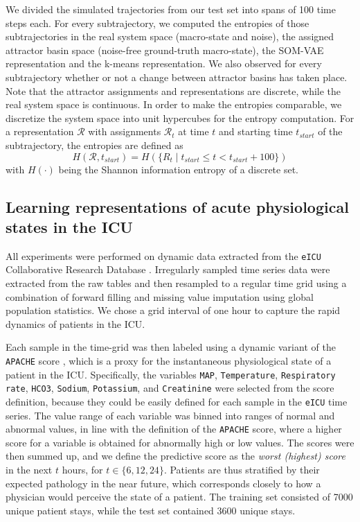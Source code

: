 We divided the simulated trajectories from our test set into spans of 100 time steps each.
For every subtrajectory, we computed the entropies of those subtrajectories in the real system space (macro-state and noise), the assigned attractor basin space (noise-free ground-truth macro-state), the SOM-VAE representation and the k-means representation.
We also observed for every subtrajectory whether or not a change between attractor basins has taken place.
Note that the attractor assignments and representations are discrete, while the real system space is continuous.
In order to make the entropies comparable, we discretize the system space into unit hypercubes for the entropy computation.
For a representation $\mathcal{R}$ with assignments $\mathcal{R}_t$ at time $t$ and starting time $t_{start}$ of the subtrajectory, the entropies are defined as
%
\begin{equation}
	H \left( \mathcal{R}, t_{start} \right) = H \left( \lbrace R_t \; \vert \; t_{start} \leq t < t_{start} + 100 \rbrace \right)
\end{equation}
%
with $H(\cdot)$ being the Shannon information entropy of a discrete set.


\subsection{Learning representations of acute physiological states in the ICU}\label{sec:ICU_appendix}

All experiments were performed on dynamic data extracted from the \texttt{eICU} Collaborative Research Database \citep{Goldberger2000}.
Irregularly sampled time series data were extracted from the raw tables and then resampled to a regular time grid using a combination of forward filling and missing value imputation using global population statistics.
We chose a grid interval of one hour to capture the rapid dynamics of patients in the ICU.

Each sample in the time-grid was then labeled using a dynamic variant of the \texttt{APACHE} score \citep{Knaus1985}, which is a proxy for the instantaneous physiological state of a patient in the ICU.
Specifically, the variables \texttt{MAP}, \texttt{Temperature}, \texttt{Respiratory rate}, \texttt{HCO3}, \texttt{Sodium}, \texttt{Potassium}, and \texttt{Creatinine} were selected from the score definition, because they could be easily defined for each sample in the \texttt{eICU} time series.
The value range of each variable was binned into ranges of normal and abnormal values, in line with the definition of the \texttt{APACHE} score, where a higher score for a variable is obtained for abnormally high or low values.
The scores were then summed up, and we define the predictive score as the \emph{worst (highest) score} in the next $t$ hours, for $t \in \{ 6, 12, 24 \}$.
Patients are thus stratified by their expected pathology in the near future, which corresponds closely to how a physician would perceive the state of a patient.
The training set consisted of 7000 unique patient stays, while the test set contained 3600 unique stays.

